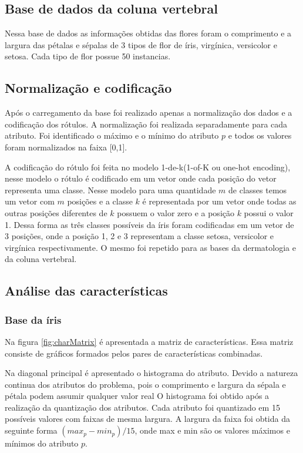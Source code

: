 \documentclass[ 
	article,			%
	11pt,				%
	oneside,			%
	a4paper,			%
	english,			%
	brazil,				%
	]{abntex2}
\begin{document}
\subsection{Base de dados da coluna vertebral}

Nessa base de dados as informações obtidas das flores foram o comprimento e a largura das
pétalas e sépalas de 3 tipos de flor de íris, virgínica, versicolor e setosa.
Cada tipo de flor possue 50 instancias.



\subsection{Normalização e codificação}
\label{ss:normCodf} 
Após o carregamento da base foi realizado apenas a normalização dos dados e a
codificação dos rótulos. A normalização foi realizada separadamente para cada
atributo. Foi identificado o máximo e o mínimo do atributo $p$ e todos os
valores foram normalizados na faixa [0,1].

A codificação do rótulo foi feita no modelo 1-de-k(1-of-K ou one-hot encoding),
nesse modelo o rótulo é codificado em um vetor onde cada posição do
vetor representa uma classe. Nesse modelo para uma quantidade $m$ de classes
temos um vetor com $m$ posições e a classe $k$ é representada por um vetor
onde todas as outras posições diferentes de $k$ possuem o valor zero e a
posição $k$ possui o valor 1. Dessa forma as três classes possíveis da íris
foram codificadas em um vetor de 3 posições, onde a posição 1, 2 e 3
representam a classe setosa, versicolor e virgínica respectivamente. O mesmo foi
repetido para as bases da dermatologia e da coluna vertebral.


\subsection{Análise das características}
\label{ss:analiCara}

\subsubsection{Base da íris}
Na figura \ref{fig:charMatrix} é apresentada a matriz de características. 
Essa matriz consiste de gráficos formados pelos pares de características
combinadas.

Na diagonal principal é apresentado o histograma do atributo.
Devido a natureza continua dos atributos do problema, pois o
comprimento e largura da sépala e pétala podem assumir qualquer valor real O
histograma foi obtido após a realização da quantização dos atributos.
Cada atributo foi quantizado em 15 possíveis valores com faixas de mesma largura. A
largura da faixa foi obtida da seguinte forma $(max_p - min_p)/15$, onde max e
min são os valores máximos e mínimos do atributo $p$.
\end{document}
